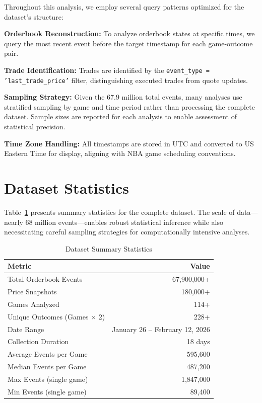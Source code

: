 \begin{methodbox}
Throughout this analysis, we employ several query patterns optimized for the dataset's structure:

\textbf{Orderbook Reconstruction:} To analyze orderbook states at specific times, we query the most recent event before the target timestamp for each game-outcome pair.

\textbf{Trade Identification:} Trades are identified by the \texttt{event\_type = 'last\_trade\_price'} filter, distinguishing executed trades from quote updates.

\textbf{Sampling Strategy:} Given the 67.9 million total events, many analyses use stratified sampling by game and time period rather than processing the complete dataset. Sample sizes are reported for each analysis to enable assessment of statistical precision.

\textbf{Time Zone Handling:} All timestamps are stored in UTC and converted to US Eastern Time for display, aligning with NBA game scheduling conventions.
\end{methodbox}

\section{Dataset Statistics}

Table~\ref{tab:data-summary} presents summary statistics for the complete dataset. The scale of data---nearly 68 million events---enables robust statistical inference while also necessitating careful sampling strategies for computationally intensive analyses.

\begin{table}[H]
\centering
\caption{Dataset Summary Statistics}
\label{tab:data-summary}
\begin{tabular}{lr}
\toprule
\textbf{Metric} & \textbf{Value} \\
\midrule
Total Orderbook Events & 67,900,000+ \\
Price Snapshots & 180,000+ \\
Games Analyzed & 114+ \\
Unique Outcomes (Games $\times$ 2) & 228+ \\
Date Range & January 26 -- February 12, 2026 \\
Collection Duration & 18 days \\
Average Events per Game & 595,600 \\
Median Events per Game & 487,200 \\
Max Events (single game) & 1,847,000 \\
Min Events (single game) & 89,400 \\
\bottomrule
\end{tabular}
\end{table}

